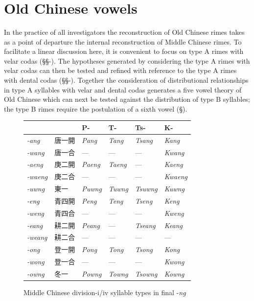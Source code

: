 \section{Old Chinese vowels}

\paragraph{}
\label{par:old-chinese-vowels}
In the practice of all investigators the reconstruction of Old
Chinese rimes takes as a point of departure the internal reconstruction
of Middle Chinese rimes. To facilitate a linear discussion here, it is
convenient to focus on type A rimes with velar codas (§§-). The
hypotheses generated by considering the type A rimes with velar codas
can then be tested and refined with reference to the type A rimes with
dental codas (§§-). Together the consideration of distributional
relationships in type A syllables with velar and dental codas generates
a five vowel theory of Old Chinese which can next be tested against the
distribution of type B syllables; the type B rimes require the
postulation of a sixth vowel (§).

\begin{figure}
    \centering
\begin{tabular}{|l|l|l|l|l|l|}
\hline
& & P- &
T- &
Ts- &
K- \\ \hline
{\emph{-ang}} &
唐一開 &
{\emph{Pang}} &
{\emph{Tang}} &
{\emph{Tsang}} &
{\emph{Kang}} \\ \hline
{\emph{-wang}} &
唐一合 &
--- &
--- &
--- &
{\emph{Kwang}} \\ \hline
{\emph{-aeng}} &
庚二開 &
{\emph{Paeng}} &
{\emph{Taeng}} &
--- &
{\emph{Kaeng}} \\ \hline
{\emph{-waeng}} &
庚二合 &
--- &
--- &
--- &
{\emph{Kwaeng}} \\ \hline
{\emph{-uwng}} &
東一 &
{\emph{Puwng}} &
{\emph{Tuwng}} &
{\emph{Tsuwng}} &
{\emph{Kuwng}} \\ \hline
{\emph{-eng}} &
青四開 &
{\emph{Peng}} &
{\emph{Teng}} &
{\emph{Tseng}} &
{\emph{Keng}} \\ \hline
{\emph{-weng}} &
青四合 &
--- &
--- &
--- &
{\emph{Kweng}} \\ \hline
{\emph{-eang}} &
耕二開 &
{\emph{Peang}} &
--- &
{\emph{Tseang}} &
{\emph{Keang}} \\ \hline
{\emph{-weang}} &
耕二合 &
--- &
--- &
--- &
--- \\ \hline
{\emph{-ong}} &
登一開 &
{\emph{Pong}} &
{\emph{Tong}} &
{\emph{Tsong}} &
{\emph{Kong}} \\ \hline
{\emph{-wong}} &
登一合 &
--- &
--- &
--- &
{\emph{Kwong}} \\ \hline
{\emph{-owng}} &
冬一 & 
{\emph{Powng}} &
{\emph{Towng}} &
{\emph{Tsowng}} &
{\emph{Kowng}}
\\ \hline
\end{tabular}

    \caption{Middle Chinese division-i/iv syllable types in final -\textit{ng} 
    \citep[198]{Baxter2014OldChinese}}
    \label{fig:MChi-i/iv-final-ng}
\end{figure}


